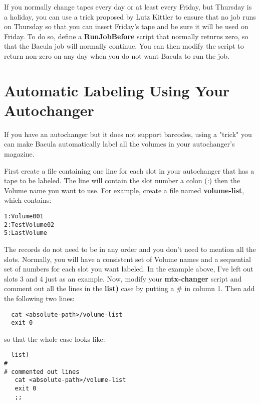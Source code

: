 If you normally change tapes every day or at least every Friday, but Thursday
is a holiday, you can use a trick proposed by Lutz Kittler to ensure that no
job runs on Thursday so that you can insert Friday's tape and be sure it will
be used on Friday. To do so, define a {\bf RunJobBefore} script that normally
returns zero, so that the Bacula job will normally continue. You can then
modify the script to return non-zero on any day when you do not want Bacula to
run the job.

\section{Automatic Labeling Using Your Autochanger}
\label{autolabel}

If you have an autochanger but it does not support barcodes, using a "trick"
you can make Bacula automatically label all the volumes in your autochanger's
magazine.

First create a file containing one line for each slot in your autochanger that
has a tape to be labeled. The line will contain the slot number a colon (:)
then the Volume name you want to use. For example, create a file named {\bf
volume-list}, which contains:

\footnotesize
\begin{verbatim}
1:Volume001
2:TestVolume02
5:LastVolume
\end{verbatim}
\normalsize

The records do not need to be in any order and you don't need to mention all
the slots. Normally, you will have a consistent set of Volume names and a
sequential set of numbers for each slot you want labeled. In the example
above, I've left out slots 3 and 4 just as an example. Now, modify your {\bf
mtx-changer} script and comment out all the lines in the {\bf list)} case by
putting a \# in column 1. Then add the following two lines:

\footnotesize
\begin{verbatim}
  cat <absolute-path>/volume-list
  exit 0
\end{verbatim}
\normalsize

so that the whole case looks like:

\footnotesize
\begin{verbatim}
  list)
#
# commented out lines
   cat <absolute-path>/volume-list
   exit 0
   ;;
\end{verbatim}
\normalsize


